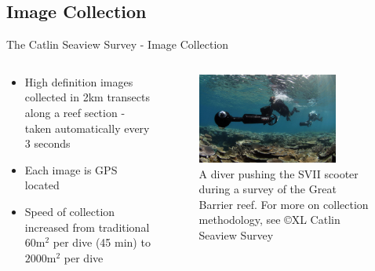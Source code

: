 \documentclass{beamer}
\begin{document}
        \subsection{Image Collection}
            \begin{frame}{The Catlin Seaview Survey - Image Collection }
              \begin{columns}[T]
                \begin{column}{0.48\textwidth}
                  \centering
                  \begin{itemize}
                    \item High definition images collected in 2km transects along a reef section - taken automatically every 3 seconds
                    \item Each image is GPS located
                    \item Speed of collection increased from traditional $60$m$^2$ per dive (45 min) to $2000$m$^2$ per dive
                  \end{itemize}
                \end{column}
                \begin{column}{0.48\textwidth}
                  \begin{figure}
                      \centering
                      \includegraphics[width = 0.8\textwidth]{SVII.jpg}
                      \caption{{\footnotesize A diver pushing the SVII scooter during a survey of the Great Barrier reef. For more on collection methodology, see \cite{Gonz16} \copyright XL Catlin Seaview Survey}}
                  \end{figure}
                \end{column}
              \end{columns}
            \end{frame}
\end{document}
